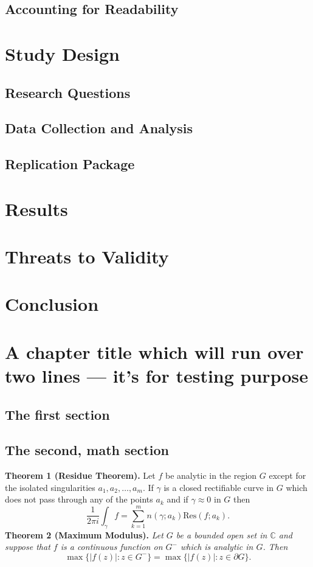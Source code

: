 \documentclass[12pt,mscthesis]{usiinfthesis}
\begin{document}
	\section{Accounting for Readability}

\chapter{Study Design}
	\section{Research Questions}
	\section{Data Collection and Analysis}	
	\section{Replication Package}

\chapter{Results}

\chapter{Threats to Validity}

\chapter{Conclusion}

\chapter[Short title]{A chapter title which will run over two lines --- it's for
  testing purpose}

\lipsum[1-2]

\section{The first section}
\lipsum[3-4]

 \section{The second, math section}

\textbf{Theorem 1 (Residue Theorem).}
Let $f$ be analytic in the region $G$ except for the isolated singularities $a_1,a_2,\ldots,a_m$. If $\gamma$ is a closed rectifiable curve in $G$ which does not pass through any of the points $a_k$ and if $\gamma\approx 0$ in $G$ then
\[
\frac{1}{2\pi i}\int_\gamma f = \sum_{k=1}^m n(\gamma;a_k) \text{Res}(f;a_k).
\]
\textbf{Theorem 2 (Maximum Modulus).}
\emph{Let $G$ be a bounded open set in $\mathbb{C}$ and suppose that $f$ is a continuous function on $G^-$ which is analytic in $G$. Then}
\[
\max\{|f(z)|:z\in G^-\}=\max \{|f(z)|:z\in \partial G \}.
\]
\end{document}

